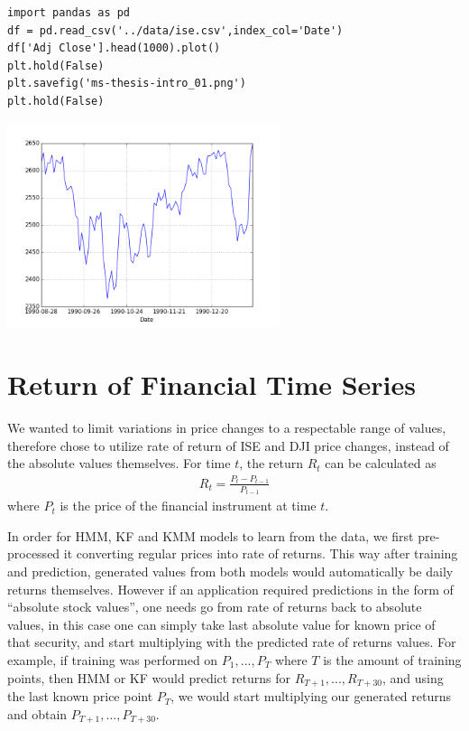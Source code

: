 \begin{verbatim}
import pandas as pd
df = pd.read_csv('../data/ise.csv',index_col='Date')
df['Adj Close'].head(1000).plot()
plt.hold(False)
plt.savefig('ms-thesis-intro_01.png')
plt.hold(False)
\end{verbatim}

\includegraphics[height=6cm]{ms-thesis-intro_01.png}


\section{Return of Financial Time Series}

We wanted to limit variations in price changes to a respectable range of values,
therefore chose to utilize rate of return of ISE and DJI price changes, instead
of the absolute values themselves. For time $t$, the return $R_t$ can be
calculated as
\begin{eqnarray*}
R_t = \frac{P_t - P_{t-1}}{P_{t-1}}
\end{eqnarray*}
where $P_t$ is the price of the financial instrument at time $t$. 

In order for HMM, KF and KMM models to learn from the data, we first pre-processed it
converting regular prices into rate of returns. This way after training and
prediction, generated values from both models would automatically be daily
returns themselves. However if an application required predictions in the form
of ``absolute stock values'', one needs go from rate of returns back to absolute
values, in this case one can simply take last absolute value for known price of
that security, and start multiplying with the predicted rate of returns
values. For example, if training was performed on $P_1,...,P_T$ where $T$ is the
amount of training points, then HMM or KF would predict returns for
$R_{T+1},...,R_{T+30}$, and using the last known price point $P_T$, we would
start multiplying our generated returns and obtain $P_{T+1},...,P_{T+30}$.

